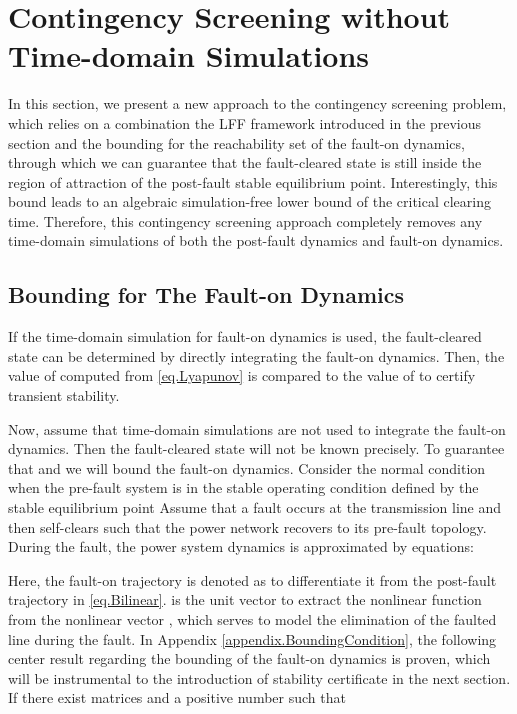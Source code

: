 \documentclass[final]{IEEEtran}
\begin{document}
\section{Contingency Screening without Time-domain Simulations}
\label{sec:certificate}

In this section, we present a new approach to the contingency
screening  problem, which relies on a combination the LFF
framework introduced in the previous section and the bounding for
the reachability set of the fault-on dynamics, through which we
can guarantee that the fault-cleared state is still inside the
region of attraction of the post-fault stable equilibrium point.
Interestingly, this bound leads to an algebraic simulation-free
lower bound of the critical clearing time. Therefore, this
contingency screening approach completely removes any time-domain
simulations of both the post-fault dynamics and fault-on dynamics.

\subsection{Bounding for The Fault-on Dynamics}

If the time-domain simulation for fault-on dynamics is used, the
fault-cleared state  can be determined by directly
integrating the fault-on dynamics. Then, the value of  computed from \eqref{eq.Lyapunov} is compared to the value
of  to certify transient stability.


Now, assume that time-domain simulations are not used to integrate
the fault-on dynamics. Then the fault-cleared state  will not
be known precisely. To guarantee that  and  we will bound the fault-on dynamics. Consider
the normal condition when the pre-fault system is in the stable
operating condition defined by the stable equilibrium point
 Assume that a fault occurs at
the transmission line  and then
self-clears such that the power network recovers to its pre-fault
topology.
During the fault, the power system dynamics is approximated by equations:

Here, the fault-on trajectory is denoted as  to
differentiate it from the post-fault trajectory  in
\eqref{eq.Bilinear}.  is the unit vector to extract
the nonlinear function
 from the
nonlinear vector
,
which serves to model the elimination of the faulted line
 during the fault. In Appendix
\ref{appendix.BoundingCondition}, the following center result
regarding the bounding of the fault-on dynamics is proven, which
will be instrumental to the introduction of stability certificate
in the next section. If there exist matrices  and a
positive number  such that
\end{document}
